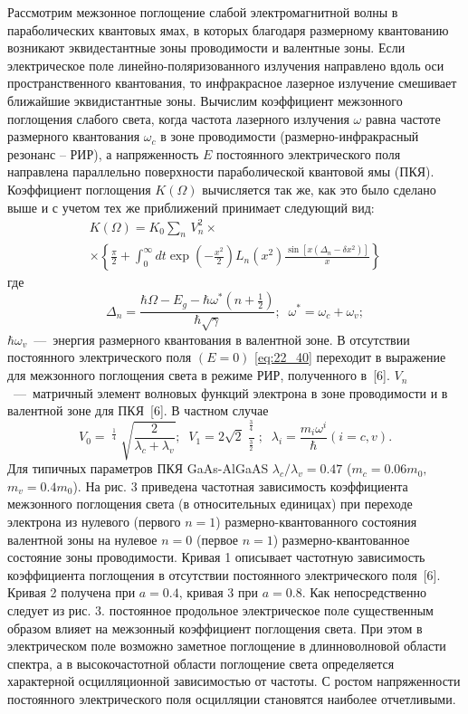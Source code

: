 {Рассмотрим межзонное поглощение слабой электромагнитной волны в параболических квантовых ямах, в которых благодаря размерному квантованию возникают эквидестантные зоны проводимости и валентные зоны. Если электрическое поле линейно-поляризованного излучения направлено вдоль оси пространственного квантования, то инфракрасное лазерное излучение смешивает ближайшие эквидистантные зоны. Вычислим коэффициент межзонного поглощения слабого света, когда частота лазерного излучения $\omega $ равна частоте размерного квантования $\omega _{c} $ в зоне проводимости (размерно-инфракрасный резонанс -- РИР), а напряженность $E$ постоянного электрического поля направлена параллельно поверхности параболической квантовой ямы (ПКЯ). Коэффициент поглощения $K(\Omega )$ вычисляется так же, как это было сделано выше и с учетом тех же приближений принимает следующий вид: 
\begin{multline} \label{eq:22_40} 
K(\Omega )=K_{0} \sum _{n} \, V_{n}^{2} \times  \\
\times \left\{\frac{\pi }{2} +\int _{0}^{\infty } dt \exp \left(-\frac{x^{2} }{2} \right)L_{n} \left(x^{2} \right)\frac{\sin \left[x\left(\Delta _{n} -\delta x^{2} \right)\right]}{x} \right\}
\end{multline} 
где 
\[\Delta _{n} =\frac{\hbar \Omega -E_{g} -\hbar \omega ^{*} \left(n+{\tfrac{1}{2}} \right)}{\hbar \sqrt{\gamma } } ;\; \; \omega ^{*} =\omega _{c} +\omega _{v} ;\] 
$\hbar \omega _{v} $~---~энергия размерного квантования в валентной зоне. В отсутствии постоянного электрического поля $(E=0)$ \eqref{eq:22_40} переходит в выражение для межзонного поглощения света в режиме РИР, полученного в~[6]. $V_{n} $~---~матричный элемент волновых функций электрона в зоне проводимости и в валентной зоне для ПКЯ~[6]. В частном случае 
\[V_{0} =\mathop{\left(\lambda _{c} \lambda _{v} \right)}\nolimits^{{\tfrac{1}{4}} } \sqrt{\frac{2}{\lambda _{c} +\lambda _{v} } } ;\; \; V_{1} =2\sqrt{2} \frac{\mathop{\left(\lambda _{c} \lambda _{v} \right)}\nolimits^{{\tfrac{3}{4}} } }{\mathop{\left(\lambda _{c} +\lambda _{v} \right)}\nolimits^{{\tfrac{3}{2}} } } ;\; \; \lambda _{i} =\frac{m_{i} \omega ^{i} }{\hbar } (i=c,v).\] 
Для типичных параметров ПКЯ GaAs-AlGaAS $\lambda _{c} /\lambda _{v} =0.47$ ($m_{c} =0.06m_{0} ,$ $m_{v} =0.4m_{0} $). На рис. 3 приведена частотная зависимость коэффициента межзонного поглощения света (в относительных единицах) при переходе электрона из нулевого (первого $n=1$) размерно-квантованного состояния валентной зоны на нулевое $n=0$ (первое $n=1$) размерно-квантованное состояние зоны проводимости. Кривая 1 описывает частотную зависимость коэффициента поглощения в отсутствии постоянного электрического поля~[6]. Кривая 2 получена при $a=0.4$, кривая 3 при $a=0.8$. Как непосредственно следует из рис. 3. постоянное продольное электрическое поле существенным образом влияет на межзонный коэффициент поглощения света. При этом в электрическом поле возможно заметное поглощение в длинноволновой области спектра, а в высокочастотной области поглощение света определяется характерной осцилляционной зависимостью от частоты. С ростом напряженности постоянного электрического поля осцилляции становятся наиболее отчетливыми. 
}
